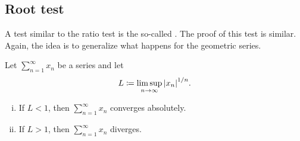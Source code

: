 

\subsection{Root test}

A test similar to the ratio test is the so-called
\emph{}.  The proof of this test is similar.
Again, the idea is to generalize what happens for the geometric series.

\begin{prop}
Let $\sum_{n=1}^\infty x_n$ be a series and let
\begin{equation*}
L \coloneqq \limsup_{n\to\infty} {\lvert {x_n} \rvert}^{1/n} .
\end{equation*}
\begin{enumerate}[(i)]
\item If $L < 1$, then $\sum_{n=1}^\infty x_n$ converges absolutely.
\item If $L > 1$, then $\sum_{n=1}^\infty x_n$ diverges.
\end{enumerate}
\end{prop}

